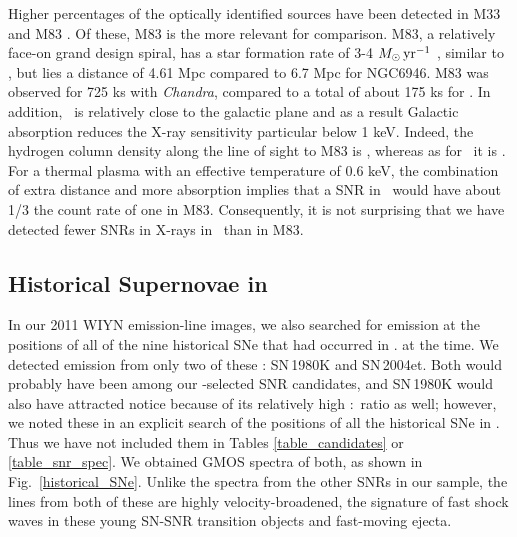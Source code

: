 Higher percentages of the optically identified sources have been detected in M33 \citep[112/200,][]{long18} and M83 \citep[67/225,][]{long14}.  Of these, M83 is the more relevant for comparison.  M83, a relatively face-on grand design spiral, has a star formation rate of 3-4 $M_\odot\,{\rm yr}^{-1}$ \citep{boisser05}, similar to \gal, but lies a distance of 4.61 Mpc \citep{sahu06} compared to 6.7 Mpc for NGC6946.  M83 was observed for 725 ks with {\em Chandra}, compared to a total of about 175 ks for \gal.    In addition, \gal\ is relatively close to the galactic plane and as a result Galactic absorption reduces the X-ray sensitivity particular below 1 keV.  Indeed, the hydrogen column density along the line of sight to M83 is  , whereas as for \gal\ it is  \citep{kaberla05}. For a thermal plasma with an effective temperature of 0.6 keV, the combination of extra distance and more absorption implies that a SNR in \gal\ would have about 1/3 the count rate of one in M83.  Consequently, it is not surprising that we have detected fewer SNRs in X-rays in \gal\ than in M83.



\subsection{Historical Supernovae in \gal}
In our 2011 WIYN emission-line images, we also searched for emission at the positions of all of the nine historical SNe that had occurred in \gal. at the time.  We detected emission from only two of these : SN\,1980K and SN\,2004et.  Both would probably have been among our \sii-selected SNR candidates, and SN\,1980K would also have attracted notice because of its relatively high \oiii:\ha\ ratio as well; however, we noted these in an explicit search of the positions of all the historical SNe in \gal.  Thus we have not included them in Tables \ref{table_candidates} or \ref{table_snr_spec}.
We  obtained GMOS spectra of both, as shown in Fig.~\ref{historical_SNe}.  Unlike the spectra from the other SNRs in our sample, the lines from both of these are highly velocity-broadened, the signature of fast shock waves in these young SN-SNR transition objects and fast-moving ejecta.

